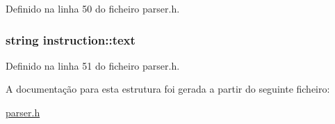 Definido na linha 50 do ficheiro parser.\-h.

\hypertarget{structinstruction_af31af10ecfe7d2fdf154616d0aede8ea}{
\subsubsection[{text}]{\setlength{\rightskip}{0pt plus 5cm}string instruction\-::text}}\label{structinstruction_af31af10ecfe7d2fdf154616d0aede8ea}


Definido na linha 51 do ficheiro parser.\-h.



A documentação para esta estrutura foi gerada a partir do seguinte ficheiro\-:\begin{DoxyCompactItemize}
\item 
\hyperlink{parser_8h}{parser.\-h}\end{DoxyCompactItemize}
